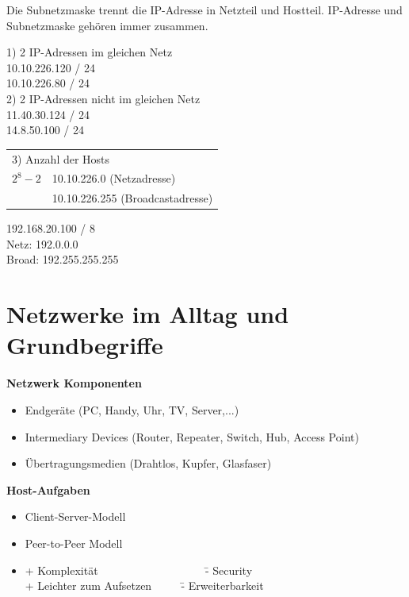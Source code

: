 Die Subnetzmaske trennt die IP-Adresse in Netzteil und Hostteil. IP-Adresse und Subnetzmaske gehören immer zusammen.

1) 2 IP-Adressen im gleichen Netz \\
10.10.226.120 / 24 \\
10.10.226.80 / 24 \\

2) 2 IP-Adressen nicht im gleichen Netz \\
11.40.30.124 / 24 \\
14.8.50.100 / 24 \\

\begin{table}[H]
	\begin{tabular}{ll}
		\multicolumn{2}{l}{3) Anzahl der Hosts} \\
		$2^{8} - 2$ & 10.10.226.0 (Netzadresse)\\
		& 10.10.226.255 (Broadcastadresse)\\
	\end{tabular}
\end{table}

192.168.20.100 / 8 \\
Netz:  192.0.0.0 \\
Broad: 192.255.255.255


\chapter{Netzwerke im Alltag und Grundbegriffe}
\textbf{Netzwerk Komponenten}
\begin{itemize}
	\item Endgeräte (PC, Handy, Uhr, TV, Server,...)
	\item Intermediary Devices (Router, Repeater, Switch, Hub, Access Point)
	\item Übertragungsmedien (Drahtlos, Kupfer, Glasfaser)
\end{itemize}

\textbf{Host-Aufgaben}
\begin{itemize}
	\item Client-Server-Modell
	\item Peer-to-Peer Modell
	\item[] \begin{tabbing}
		+ Komplexität ~~~~~~~~~~~~~~~~~~ \= - Security\\
		+ Leichter zum Aufsetzen ~~~~ \= - Erweiterbarkeit\\
	\end{tabbing}
\end{itemize}

